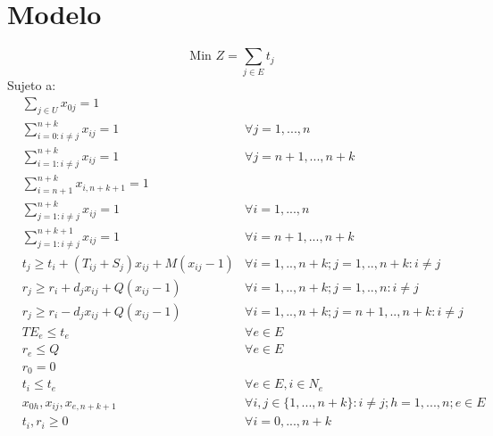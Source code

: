 \documentclass{article}
\begin{document}
\section{Modelo}
\begin{equation}
    \mbox{Min }Z=\sum_{j \in E} t_{j}
\end{equation}
Sujeto a: \begin{align}
& \sum_{j \in U} x_{0j} = 1 \\
& \sum_{i=0: i\neq j}^{n+k}x_{ij} = 1  & \forall j = 1,...,n \\
& \sum_{i=1: i\neq j}^{n+k}x_{ij} = 1  & \forall j = n+1,...,n+k \\
& \sum_{i=n+1}^{n+k}x_{i,n+k+1} = 1 \\
& \sum_{j=1: i\neq j}^{n+k}x_{ij} = 1  & \forall i = 1,...,n \\
& \sum_{j=1: i\neq j}^{n+k+1}x_{ij} = 1  & \forall i = n+1,...,n+k \\
& t_{j} \geq t_{i} + (T_{ij} + S_{j})x_{ij} + M(x_{ij} - 1) & \forall i=1,..,n+k; j=1,..,n+k:i\neq j \\
& r_{j} \geq r_{i} + d_{j}x_{ij} + Q(x_{ij} - 1) & \forall i=1,..,n+k; j=1,..,n:i\neq j \\
& r_{j} \geq r_{i} - d_{j}x_{ij} + Q(x_{ij} - 1) & \forall i=1,..,n+k; j=n+1,..,n+k:i\neq j \\
& TE_{e} \leq t_{e}  & \forall e \in E \\
& r_{e} \leq Q  & \forall e \in E \\
& r_{0} = 0 \\
& t_{i} \leq t_{e}  & \forall e \in E, i \in N_{e} \\
& x_{0h}, x_{ij}, x_{e,n+k+1} & \forall i,j \in \{1,...,n+k\}: i\neq j; h = 1,...,n; e \in E \\
& t_{i}, r_{i} \geq 0 & \forall i = 0, ..., n+k
\end{align}
\end{document}
